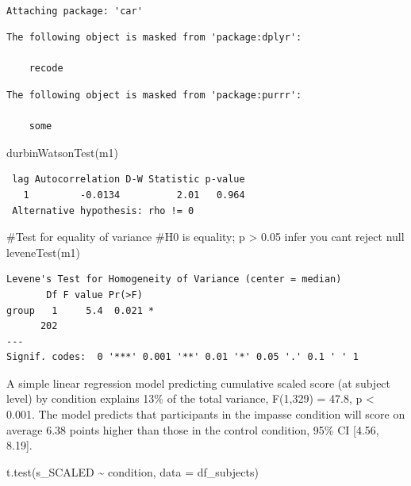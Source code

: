 \documentclass[
  letterpaper,
  DIV=11,
  numbers=noendperiod]{scrreprt}
\newenvironment{Shaded}{\begin{snugshade}}{\end{snugshade}}
\newcommand{\AttributeTok}[1]{\textcolor[rgb]{0.40,0.45,0.13}{#1}}
\newcommand{\CommentTok}[1]{\textcolor[rgb]{0.37,0.37,0.37}{#1}}
\newcommand{\FunctionTok}[1]{\textcolor[rgb]{0.28,0.35,0.67}{#1}}
\newcommand{\NormalTok}[1]{\textcolor[rgb]{0.00,0.23,0.31}{#1}}
\newcommand{\SpecialCharTok}[1]{\textcolor[rgb]{0.37,0.37,0.37}{#1}}
\begin{document}
\begin{verbatim}

Attaching package: 'car'
\end{verbatim}

\begin{verbatim}
The following object is masked from 'package:dplyr':

    recode
\end{verbatim}

\begin{verbatim}
The following object is masked from 'package:purrr':

    some
\end{verbatim}

\begin{Shaded}
\begin{Highlighting}[]
\FunctionTok{durbinWatsonTest}\NormalTok{(m1)}
\end{Highlighting}
\end{Shaded}

\begin{verbatim}
 lag Autocorrelation D-W Statistic p-value
   1         -0.0134          2.01   0.964
 Alternative hypothesis: rho != 0
\end{verbatim}

\begin{Shaded}
\begin{Highlighting}[]
\CommentTok{\#Test for equality of variance}
\CommentTok{\#H0 is equality; p \textgreater{} 0.05 infer you can\textquotesingle{}t reject null}
\FunctionTok{leveneTest}\NormalTok{(m1)}
\end{Highlighting}
\end{Shaded}

\begin{verbatim}
Levene's Test for Homogeneity of Variance (center = median)
       Df F value Pr(>F)  
group   1     5.4  0.021 *
      202                 
---
Signif. codes:  0 '***' 0.001 '**' 0.01 '*' 0.05 '.' 0.1 ' ' 1
\end{verbatim}

A simple linear regression model predicting cumulative scaled score (at
subject level) by condition explains 13\% of the total variance,
F(1,329) = 47.8, p \textless{} 0.001. The model predicts that
participants in the impasse condition will score on average 6.38 points
higher than those in the control condition, 95\% CI {[}4.56, 8.19{]}.

\begin{Shaded}
\begin{Highlighting}[]
\FunctionTok{t.test}\NormalTok{(s\_SCALED }\SpecialCharTok{\textasciitilde{}}\NormalTok{ condition, }\AttributeTok{data =}\NormalTok{ df\_subjects)}
\end{Highlighting}
\end{Shaded}
\end{document}

